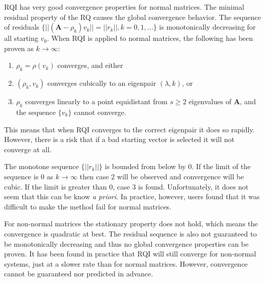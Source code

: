 \documentclass[12pt]{article}
\newcommand{\ve}[1]{\ensuremath{\mathbf{#1}}}
\begin{document}
RQI has very good convergence properties for normal matrices. The minimal residual property of the RQ causes the global convergence behavior. The sequence of residuals $\{ ||(\ve{A} - \rho_{k})v_{k}|| = ||r_{k}||, k = 0, 1, ... \}$ is monotonically decreasing for all starting $v_{0}$. When RQI is applied to normal matrices, the following has been proven as $k \to \infty$:
%
\begin{enumerate}
 \item $\rho_{k} = \rho(v_{k})$ converges, and either
 \item $(\rho_{k}, v_{k})$ converges cubically to an eigenpair $(\lambda, k)$, or
 \item $\rho_{k}$ converges linearly to a point equidistant from $s \ge 2$ eigenvalues of $\ve{A}$, and the sequence $\{v_{k}\}$ cannot converge. 
\end{enumerate}
%
This means that when RQI converges to the correct eigenpair it does so rapidly. However, there is a risk that if a bad starting vector is selected it will not converge at all.%

The monotone sequence $\{||r_{k}||\}$ is bounded from below by 0. If the limit of the sequence is 0 as $k \to \infty$ then case 2 will be observed and convergence will be cubic. If the limit is greater than 0, case 3 is found. Unfortunately, it does not seem that this can be know \emph{a priori}. In practice, however, users found that it was difficult to make the method fail for normal matrices.%

For non-normal matrices the stationary property does not hold, which means the convergence is quadratic at best. The residual sequence is also not guaranteed to be monotonically decreasing and thus no global convergence properties can be proven. It has been found in practice that RQI will still converge for non-normal systems, just at a slower rate than for normal matrices. However, convergence cannot be guaranteed nor predicted in advance.%

\end{document}
